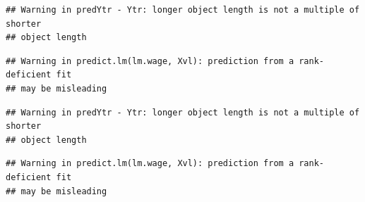 \documentclass[]{article}
\begin{document}
\begin{verbatim}
## Warning in predYtr - Ytr: longer object length is not a multiple of shorter
## object length
\end{verbatim}

\begin{verbatim}
## Warning in predict.lm(lm.wage, Xvl): prediction from a rank-deficient fit
## may be misleading
\end{verbatim}

\begin{verbatim}
## Warning in predYtr - Ytr: longer object length is not a multiple of shorter
## object length
\end{verbatim}

\begin{verbatim}
## Warning in predict.lm(lm.wage, Xvl): prediction from a rank-deficient fit
## may be misleading
\end{verbatim}
\end{document}
